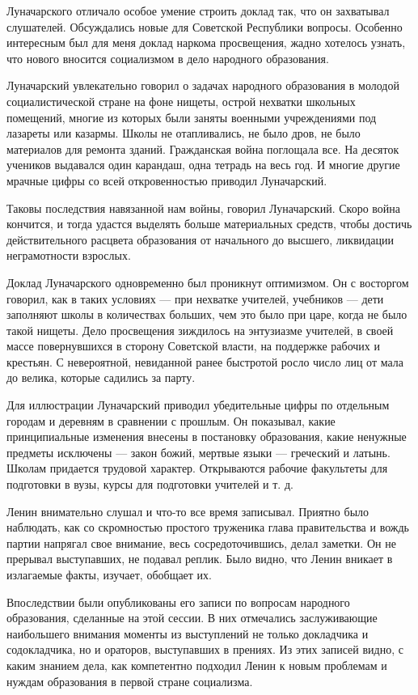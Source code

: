 \documentclass[12pt, a4paper, openany]{book}
\begin{document}
Луначарского отличало особое умение строить доклад так, что он захватывал слушателей. Обсуждались новые для Советской Республики вопросы. Особенно интересным был для меня доклад наркома просвещения, жадно хотелось узнать, что нового вносится социализмом в дело народного образования.

Луначарский увлекательно говорил о задачах народного образования в молодой социалистической стране на фоне нищеты, острой нехватки школьных помещений, многие из которых были заняты военными учреждениями под лазареты или казармы. Школы не отапливались, не было дров, не было материалов для ремонта зданий. Гражданская война поглощала все. На десяток учеников выдавался один карандаш, одна тетрадь на весь год. И многие другие мрачные цифры со всей откровенностью приводил Луначарский.

Таковы последствия навязанной нам войны, говорил Луначарский. Скоро война кончится, и тогда удастся выделять больше материальных средств, чтобы достичь действительного расцвета образования от начального до высшего, ликвидации неграмотности взрослых.

Доклад Луначарского одновременно был проникнут оптимизмом. Он с восторгом говорил, как в таких условиях — при нехватке учителей, учебников — дети заполняют школы в количествах больших, чем это было при царе, когда не было такой нищеты. Дело просвещения зиждилось на энтузиазме учителей, в своей массе повернувшихся в сторону Советской власти, на поддержке рабочих и крестьян. С невероятной, невиданной ранее быстротой росло число лиц от мала до велика, которые садились за парту.

Для иллюстрации Луначарский приводил убедительные цифры по отдельным городам и деревням в сравнении с прошлым. Он показывал, какие принципиальные изменения внесены в постановку образования, какие ненужные предметы исключены — закон божий, мертвые языки — греческий и латынь. Школам придается трудовой характер. Открываются рабочие факультеты для подготовки в вузы, курсы для подготовки учителей и т. д.

Ленин внимательно слушал и что-то все время записывал. Приятно было наблюдать, как со скромностью простого труженика глава правительства и вождь партии напрягал свое внимание, весь сосредоточившись, делал заметки. Он не прерывал выступавших, не подавал реплик. Было видно, что Ленин вникает в излагаемые факты, изучает, обобщает их.

Впоследствии были опубликованы его записи по вопросам народного образования, сделанные на этой сессии. В них отмечались заслуживающие наибольшего внимания моменты из выступлений не только докладчика и содокладчика, но и ораторов, выступавших в прениях. Из этих записей видно, с каким знанием дела, как компетентно подходил Ленин к новым проблемам и нуждам образования в первой стране социализма.
\end{document}
